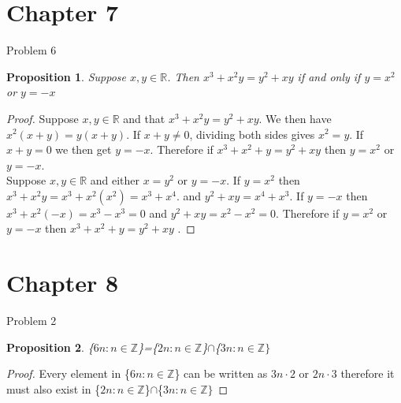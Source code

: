 \documentclass[12pt,letterpaper, onecolumn]{exam}
\newtheorem*{prop}{Proposition}
\begin{document}
	\section{Chapter 7}
	\centerline{Problem 6}
	\begin{prop}
	Suppose $x,y\in\mathbb{R}$. Then  $x^3+x^2y=y^2+xy$ if and only if $y=x^2$ or $y=-x$
	\end{prop}
	
	\begin{proof}
	Suppose $x,y\in\mathbb{R}$ and that $x^3+x^2y=y^2+xy$. We then have $x^2(x+y)=y(x+y)$. If $x+y\neq0$, dividing both sides gives $x^2=y$. If $x+y=0$ we then get $y=-x$. Therefore if $x^3+x^2+y=y^2+xy$ then $y=x^2$ or $y=-x$.\\
	Suppose $x,y\in\mathbb{R}$ and either $x=y^2$ or $y=-x$. If $y=x^2$ then  $x^3+x^2y=x^3+x^2(x^2)=x^3+x^4.$ and $y^2+xy=x^4+x^3$. If $y=-x$ then $x^3+x^2(-x)=x^3-x^3=0$ and $y^2+xy=x^2-x^2=0$. Therefore if $y=x^2$ or $y=-x$ then $x^3+x^2+y=y^2+xy$ .
	\end{proof}
	
	\section{Chapter 8}
	\centerline{Problem 2}
	\begin{prop}
		\{$6n:n\in\mathbb{Z}$\}=\{$2n:n\in\mathbb{Z}$\}$\cap$\{$3n:n\in\mathbb{Z}\}$
	\end{prop}
	
	\begin{proof}
		Every element in \{$6n:n\in\mathbb{Z}$\} can be written as $3n\cdot2$ or $2n\cdot3$ therefore it must also exist in \{$2n:n\in\mathbb{Z}$\}$\cap$\{$3n:n\in\mathbb{Z}\}$
	\end{proof}
\end{document}
